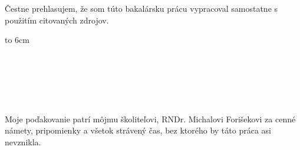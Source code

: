 \documentclass[11pt,a4paper]{book}
\begin{document}
{~}\vspace{12cm}

\begin{minipage}{0.25\textwidth}~\end{minipage}
\begin{minipage}{0.69\textwidth}
Čestne prehlasujem, že som túto bakalársku prácu vypracoval samostatne
s použitím citovaných zdrojov.

\bigskip\bigskip

\hfill\hbox to 6cm{\dotfill}
\end{minipage}
\vfill\eject %
\pagecolor{white}
\thispagestyle{empty}~\vfill\eject %

{~}\vspace{12cm}

\begin{minipage}{0.05\textwidth}~\end{minipage}
\begin{minipage}{0.79\textwidth}
Moje poďakovanie patrí môjmu školiteľovi, RNDr. Michalovi Forišekovi
za cenné námety, pripomienky a všetok strávený čas, bez ktorého by
táto práca asi nevznikla.
\end{minipage}
\vfill\eject
~\vfill\eject

~\vfill\eject %
~\vfill\eject

\tableofcontents


\mainmatter



\backmatter
\listoffigures
\listoftables



\end{document}
